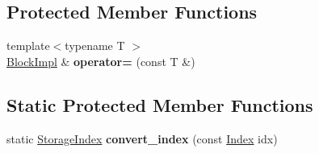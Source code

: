 \subsection*{Protected Member Functions}
\begin{DoxyCompactItemize}
\item 
\mbox{\label{class_eigen_1_1_block_impl_3_01_xpr_type_00_01_block_rows_00_01_block_cols_00_01true_00_01_sparse_01_4_ac99a8afd4c9ac1c54c9e043ec8acc7a9}} 
{\footnotesize template$<$typename T $>$ }\\\mbox{\hyperlink{class_eigen_1_1_block_impl}{Block\+Impl}} \& {\bfseries operator=} (const T \&)
\end{DoxyCompactItemize}
\subsection*{Static Protected Member Functions}
\begin{DoxyCompactItemize}
\item 
\mbox{\label{class_eigen_1_1_block_impl_3_01_xpr_type_00_01_block_rows_00_01_block_cols_00_01true_00_01_sparse_01_4_afb07f167dace0de85688250a42acde46}} 
static \mbox{\hyperlink{class_eigen_1_1_sparse_matrix_base_a0b540ba724726ebe953f8c0df06081ed}{Storage\+Index}} {\bfseries convert\+\_\+index} (const \mbox{\hyperlink{struct_eigen_1_1_eigen_base_a554f30542cc2316add4b1ea0a492ff02}{Index}} idx)
\end{DoxyCompactItemize}
